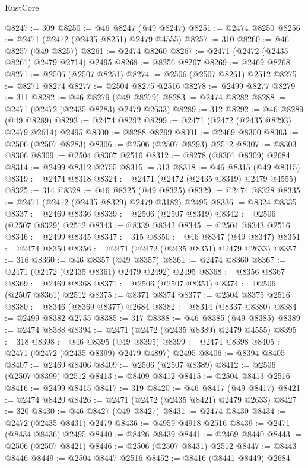 \begin{lexlean}{RustCore}
\begin{coremodule}
@8247 := 309
@8250 := @46 @8247 (@49 @8247)
@8251 := @2474 @8250
@8256 := @2471 (@2472 (@2435 @8251) @2479 @4555)
@8257 := 310
@8260 := @46 @8257 (@49 @8257)
@8261 := @2474 @8260
@8267 := @2471 (@2472 (@2435 @8261) @2479 @2714) @2495
@8268 := @8256 @8267
@8269 := @2469 @8268
@8271 := @2506 (@2507 @8251)
@8274 := @2506 (@2507 @8261) @2512
@8275 := @8271 @8274
@8277 := @2504 @8275 @2516
@8278 := @2499 @8277
@8279 := 311
@8282 := @46 @8279 (@49 @8279)
@8283 := @2474 @8282
@8288 := @2471 (@2472 (@2435 @8283) @2479 @2633)
@8289 := 312
@8292 := @46 @8289 (@49 @8289)
@8293 := @2474 @8292
@8299 := @2471 (@2472 (@2435 @8293) @2479 @2614) @2495
@8300 := @8288 @8299
@8301 := @2469 @8300
@8303 := @2506 (@2507 @8283)
@8306 := @2506 (@2507 @8293) @2512
@8307 := @8303 @8306
@8309 := @2504 @8307 @2516
@8312 := @8278 (@8301 @8309) @2684
@8314 := @2499 @8312 @2755
@8315 := 313
@8318 := @46 @8315 (@49 @8315)
@8319 := @2474 @8318
@8324 := @2471 (@2472 (@2435 @8319) @2479 @4555)
@8325 := 314
@8328 := @46 @8325 (@49 @8325)
@8329 := @2474 @8328
@8335 := @2471 (@2472 (@2435 @8329) @2479 @3182) @2495
@8336 := @8324 @8335
@8337 := @2469 @8336
@8339 := @2506 (@2507 @8319)
@8342 := @2506 (@2507 @8329) @2512
@8343 := @8339 @8342
@8345 := @2504 @8343 @2516
@8346 := @2499 @8345
@8347 := 315
@8350 := @46 @8347 (@49 @8347)
@8351 := @2474 @8350
@8356 := @2471 (@2472 (@2435 @8351) @2479 @2633)
@8357 := 316
@8360 := @46 @8357 (@49 @8357)
@8361 := @2474 @8360
@8367 := @2471 (@2472 (@2435 @8361) @2479 @2492) @2495
@8368 := @8356 @8367
@8369 := @2469 @8368
@8371 := @2506 (@2507 @8351)
@8374 := @2506 (@2507 @8361) @2512
@8375 := @8371 @8374
@8377 := @2504 @8375 @2516
@8380 := @8346 (@8369 @8377) @2684
@8382 := @8314 (@8337 @8380)
@8384 := @2499 @8382 @2755
@8385 := 317
@8388 := @46 @8385 (@49 @8385)
@8389 := @2474 @8388
@8394 := @2471 (@2472 (@2435 @8389) @2479 @4555)
@8395 := 318
@8398 := @46 @8395 (@49 @8395)
@8399 := @2474 @8398
@8405 := @2471 (@2472 (@2435 @8399) @2479 @4897) @2495
@8406 := @8394 @8405
@8407 := @2469 @8406
@8409 := @2506 (@2507 @8389)
@8412 := @2506 (@2507 @8399) @2512
@8413 := @8409 @8412
@8415 := @2504 @8413 @2516
@8416 := @2499 @8415
@8417 := 319
@8420 := @46 @8417 (@49 @8417)
@8421 := @2474 @8420
@8426 := @2471 (@2472 (@2435 @8421) @2479 @2633)
@8427 := 320
@8430 := @46 @8427 (@49 @8427)
@8431 := @2474 @8430
@8434 := @2472 (@2435 @8431) @2479
@8436 := @4959 @4918 @2516
@8439 := @2471 (@8434 @8436) @2495
@8440 := @8426 @8439
@8441 := @2469 @8440
@8443 := @2506 (@2507 @8421)
@8446 := @2506 (@2507 @8431) @2512
@8447 := @8443 @8446
@8449 := @2504 @8447 @2516
@8452 := @8416 (@8441 @8449) @2684

\end{coremodule}
\end{lexlean}
